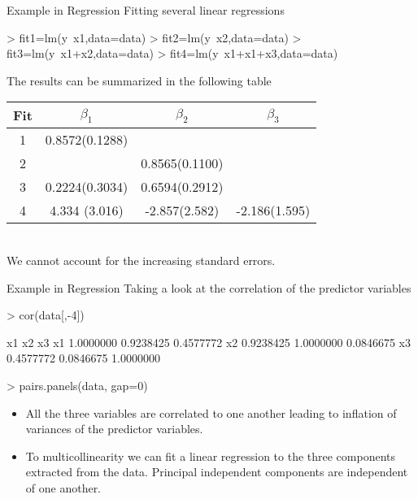 \documentclass[10pt]{beamer}
\begin{document}
\begin{frame}[fragile]{Example in Regression}
Fitting  several linear regressions
\begin{Schunk}
\begin{Sinput}
> fit1=lm(y~x1,data=data)
> fit2=lm(y~x2,data=data)
> fit3=lm(y~x1+x2,data=data)
> fit4=lm(y~x1+x1+x3,data=data)
\end{Sinput}
\end{Schunk}
The results can be summarized in the following table
\begin{tabular}{|c|c|c|c|}
	\hline 
Fit	& $\beta_{1}$ & $\beta_{2}$ & $\beta_{3}$ \\ 
	\hline 
1	& 0.8572(0.1288) &  &  \\ 
	\hline 
2	&  & 0.8565(0.1100) &  \\ 
	\hline 
3	& 0.2224(0.3034) & 0.6594(0.2912) &  \\ 
	\hline 
4	& 4.334 (3.016) & -2.857(2.582) &  -2.186(1.595)\\ 
	\hline 
\end{tabular}\\
We cannot account for the increasing standard errors.
\end{frame}

\begin{frame}[fragile]{Example in Regression}
Taking a look at the correlation of the predictor variables 
\begin{Schunk}
\begin{Sinput}
> cor(data[,-4])
\end{Sinput}
\begin{Soutput}
          x1        x2        x3
x1 1.0000000 0.9238425 0.4577772
x2 0.9238425 1.0000000 0.0846675
x3 0.4577772 0.0846675 1.0000000
\end{Soutput}
\begin{Sinput}
> pairs.panels(data, gap=0)
\end{Sinput}
\end{Schunk}
\begin{itemize}
\item All the three variables are correlated to one another leading to inflation of variances of the predictor variables.
\item To multicollinearity we can fit a linear regression to the three components extracted from the data. Principal independent components are independent of one another.
\end{itemize}
\end{frame}
\end{document}
